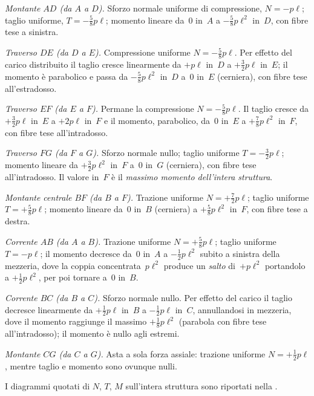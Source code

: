 \medskip
\noindent\textit{Montante $AD$ (da $A$ a $D$).}
Sforzo normale uniforme di compressione, $N = -p\ell$;
taglio uniforme, $T = -\tfrac58 p\ell$; momento lineare
da~$0$ in~$A$ a $-\tfrac58 p\ell^2$ in~$D$, con fibre tese
a sinistra.

\medskip
\noindent\textit{Traverso $DE$ (da $D$ a $E$).}
Compressione uniforme $N = -\tfrac58 p\ell$. Per effetto del
carico distribuito il taglio cresce linearmente da $+p\ell$
in~$D$ a $+\tfrac32 p\ell$ in~$E$; il momento è parabolico
e passa da $-\tfrac58 p\ell^2$ in~$D$ a~$0$ in~$E$ (cerniera),
con fibre tese all'estradosso.

\medskip
\noindent\textit{Traverso $EF$ (da $E$ a $F$).}
Permane la compressione $N = -\tfrac58 p\ell$. Il taglio
cresce da $+\tfrac32 p\ell$ in~$E$ a $+2p\ell$ in~$F$ e il
momento, parabolico, da~$0$ in~$E$ a $+\tfrac78 p\ell^2$
in~$F$, con fibre tese all'intradosso.

\medskip
\noindent\textit{Traverso $FG$ (da $F$ a $G$).}
Sforzo normale nullo; taglio uniforme $T = -\tfrac32 p\ell$;
momento lineare da $+\tfrac32 p\ell^2$ in~$F$ a~$0$ in~$G$
(cerniera), con fibre tese all'intradosso. Il valore in~$F$
è il \emph{massimo momento dell'intera struttura}.

\medskip
\noindent\textit{Montante centrale $BF$ (da $B$ a $F$).}
Trazione uniforme $N = +\tfrac72 p\ell$; taglio uniforme
$T = +\tfrac58 p\ell$; momento lineare da~$0$ in~$B$
(cerniera) a $+\tfrac58 p\ell^2$ in~$F$, con fibre tese
a destra.

\medskip
\noindent\textit{Corrente $AB$ (da $A$ a $B$).}
Trazione uniforme $N = +\tfrac58 p\ell$; taglio uniforme
$T = -p\ell$; il momento decresce da~$0$ in~$A$ a
$-\tfrac12 p\ell^2$ subito a sinistra della mezzeria, dove
la coppia concentrata~$p\ell^2$ produce un \emph{salto}
di~$+p\ell^2$ portandolo a $+\tfrac12 p\ell^2$, per poi
tornare a~$0$ in~$B$.

\medskip
\noindent\textit{Corrente $BC$ (da $B$ a $C$).}
Sforzo normale nullo. Per effetto del carico il taglio
decresce linearmente da $+\tfrac12 p\ell$ in~$B$ a
$-\tfrac12 p\ell$ in~$C$, annullandosi in mezzeria, dove il
momento raggiunge il massimo $+\tfrac18 p\ell^2$ (parabola
con fibre tese all'intradosso); il momento è nullo agli
estremi.

\medskip
\noindent\textit{Montante $CG$ (da $C$ a $G$).}
Asta a sola forza assiale: trazione uniforme
$N = +\tfrac12 p\ell$, mentre taglio e momento sono
ovunque nulli.

I diagrammi quotati di $N$, $T$, $M$ sull'intera struttura
sono riportati nella .




